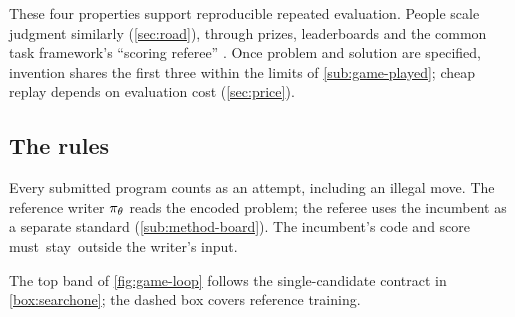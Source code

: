 These four properties support reproducible repeated evaluation. People
scale judgment similarly (\cref{sec:road}), through prizes, leaderboards and
the common task framework's ``scoring referee'' \citep{donoho2017fifty}.
Once problem and solution are specified, invention shares the first three
within the limits of \cref{sub:game-played}; cheap replay depends on
evaluation cost (\cref{sec:price}).

\subsection{The rules}\label{sub:game-rules}

Every submitted program counts as an attempt, including an illegal move.
The reference writer $\pi_{\theta}$ reads the encoded problem; the referee uses
the incumbent as a separate standard (\cref{sub:method-board}). The incumbent's code and
score \mbox{must stay outside} the writer's input.

The top band of \cref{fig:game-loop} follows the single-candidate contract
in \cref{box:searchone}; the dashed box covers reference training.

